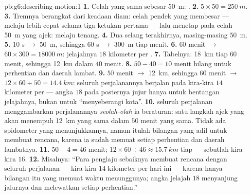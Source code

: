 \begin{solution}{pb:g6:describing-motion:1}
\textbf{1.} Celah yang sama sebesar \qty{50}{m}: .
\textbf{2.} $5 \times 50 = \qty{250}{m}$.
\textbf{3.} Tremnya berangkat dari keadaan diam: celah pendek yang
membesar --- melaju lebih cepat selama tiga ketukan pertama ---
lalu menetap pada celah \qty{50}{m} yang ajek: melaju tenang.
\textbf{4.} Dua selang terakhirnya, masing-masing \qty{50}{m}.
\textbf{5.} $10$ s $\to$ \qty{50}{m}, sehingga $60$ s $\to$
\qty{300}{m} tiap menit.
\textbf{6.} $60$ menit $\to$ $60 \times 300 = \qty{18000}{m}$:
 jelajahnya $18$ kilometer per .
\textbf{7.} Tabelnya: \qty{18}{km} tiap $60$ menit, sehingga
\qty{12}{km} dalam $40$ menit.
\textbf{8.} $50 - 40 = 10$ menit hilang untuk perhentian dan daerah
lambat.
\textbf{9.} $50$ menit $\to$ \qty{12}{km}, sehingga $60$ menit $\to$
$12 \times 60 \div 50 = \qty{14.4}{km}$: seluruh perjalanannya
berjalan pada kira-kira $14$ kilometer per  --- angka $18$ pada
posternya jujur hanya untuk bentangan jelajahnya, bukan untuk
``menyeberangi kota''.
\textbf{10.}  seluruh perjalanan menggambarkan perjalanannya
\emph{seolah-olah} ia beraturan: satu langkah ajek yang akan menempuh
\qty{12}{km} yang sama dalam $50$ menit yang sama. Tidak ada
spidometer yang menunjukkannya, namun itulah bilangan yang adil untuk
membuat rencana, karena ia sudah memuat setiap perhentian dan daerah
lambatnya.
\textbf{11.} $50 - 4 = 46$ menit; $12 \times 60 \div 46 \approx
\qty{15.7}{km}$ tiap  --- sebutlah kira-kira $16$.
\textbf{12.} Misalnya: ``Para penglaju sebaiknya membuat rencana
dengan  seluruh perjalanan --- kira-kira $14$ kilometer per
 hari ini --- karena hanya bilangan itu yang memuat waktu
menunggunya; angka jelajah $18$ menyanjung jalurnya dan melewatkan
setiap perhentian.''
\end{solution}
